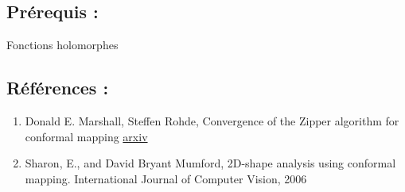 \documentclass[
]{article}
\providecommand{\tightlist}{%
  \setlength{\itemsep}{0pt}\setlength{\parskip}{0pt}}
\begin{document}
\hypertarget{pruxe9requis}{%
\subsection{Prérequis :}\label{pruxe9requis}}

Fonctions holomorphes

\hypertarget{ruxe9fuxe9rences}{%
\subsection{Références :}\label{ruxe9fuxe9rences}}

\begin{enumerate}
\def\labelenumi{\arabic{enumi}.}
\tightlist
\item
  Donald E. Marshall, Steffen Rohde, Convergence of the Zipper algorithm
  for conformal mapping \href{https://arxiv.org/abs/math/0605532}{arxiv}
\item
  Sharon, E., and David Bryant Mumford, 2D-shape analysis using
  conformal mapping. International Journal of Computer Vision, 2006
\end{enumerate}
\end{document}
